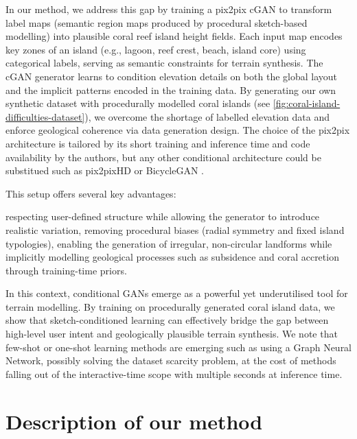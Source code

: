 \midConclusion

In our method, we address this gap by training a pix2pix cGAN to transform label maps (semantic region maps produced by procedural sketch-based modelling) into plausible coral reef island height fields. Each input map encodes key zones of an island (e.g., lagoon, reef crest, beach, island core) using categorical labels, serving as semantic constraints for terrain synthesis. The cGAN generator learns to condition elevation details on both the global layout and the implicit patterns encoded in the training data. By generating our own synthetic dataset with procedurally modelled coral islands (see \cref{fig:coral-island-difficulties-dataset}), we overcome the shortage of labelled elevation data and enforce geological coherence via data generation design. The choice of the pix2pix architecture is tailored by its short training and inference time and code availability by the authors, but any other conditional architecture could be substitued such as pix2pixHD or BicycleGAN \cite{Wang2018,Zhu2018NN}.

This setup offers several key advantages: 
\begin{Itemize}
    \Item{} respecting user-defined structure while allowing the generator to introduce realistic variation,
    \Item{} removing procedural biases (radial symmetry and fixed island typologies),
    \Item{} enabling the generation of irregular, non-circular landforms while implicitly modelling geological processes such as subsidence and coral accretion through training-time priors.
\end{Itemize}

In this context, conditional GANs emerge as a powerful yet underutilised tool for terrain modelling. By training on procedurally generated coral island data, we show that sketch-conditioned learning can effectively bridge the gap between high-level user intent and geologically plausible terrain synthesis. We note that few-shot or one-shot learning methods are emerging such as \cite{Liu2025} using a Graph Neural Network, possibly solving the dataset scarcity problem, at the cost of methods falling out of the interactive-time scope with multiple seconds at inference time.




\section{Description of our method}
\label{sec:coral-island-method-description}

